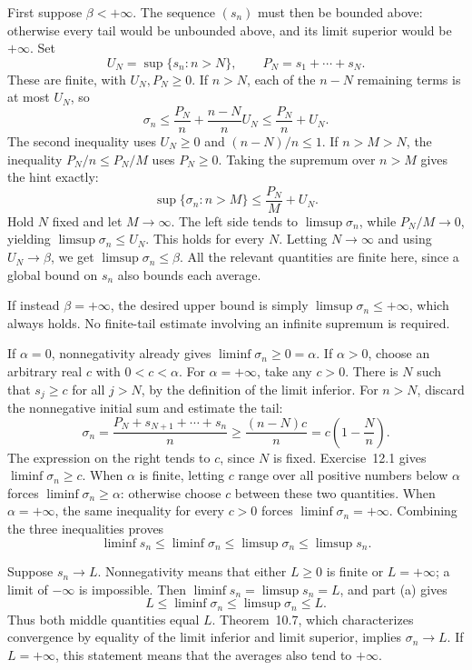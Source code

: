 First suppose $\beta<+\infty$. The sequence $(s_n)$ must then be
bounded above: otherwise every tail would be unbounded above, and
its limit superior would be $+\infty$. Set
\[
 U_N=\sup\{s_n:n>N\},\qquad P_N=s_1+\cdots+s_N.
\]
These are finite, with $U_N,P_N\ge0$. If $n>N$, each of the
$n-N$ remaining terms is at most $U_N$, so
\[
 \sigma_n\le\frac{P_N}{n}+\frac{n-N}{n}U_N
 \le\frac{P_N}{n}+U_N.
\]
The second inequality uses $U_N\ge0$ and $(n-N)/n\le1$.
If $n>M>N$, the inequality $P_N/n\le P_N/M$ uses $P_N\ge0$.
Taking the supremum over $n>M$ gives the hint exactly:
\[
 \sup\{\sigma_n:n>M\}\le\frac{P_N}{M}+U_N.
\]
Hold $N$ fixed and let $M\to\infty$. The left side tends to
$\limsup\sigma_n$, while $P_N/M\to0$, yielding
$\limsup\sigma_n\le U_N$. This holds for every $N$.
Letting $N\to\infty$ and using $U_N\to\beta$, we get
$\limsup\sigma_n\le\beta$. All the relevant quantities are finite
here, since a global bound on $s_n$ also bounds each average.

If instead $\beta=+\infty$, the desired upper bound is simply
$\limsup\sigma_n\le+\infty$, which always holds. No finite-tail
estimate involving an infinite supremum is required.

If $\alpha=0$, nonnegativity already gives
$\liminf\sigma_n\ge0=\alpha$.
If $\alpha>0$, choose an arbitrary real $c$ with $0<c<\alpha$.
For $\alpha=+\infty$, take any $c>0$. There is $N$ such that
$s_j\ge c$ for all $j>N$, by the definition of the limit inferior.
For $n>N$, discard the nonnegative initial sum and estimate the tail:
\[
 \sigma_n
 =\frac{P_N+s_{N+1}+\cdots+s_n}{n}
 \ge\frac{(n-N)c}{n}
 =c\left(1-\frac{N}{n}\right).
\]
The expression on the right tends to $c$, since $N$ is fixed.
Exercise~12.1 gives $\liminf\sigma_n\ge c$. When $\alpha$ is
finite, letting $c$ range over all positive numbers below $\alpha$
forces $\liminf\sigma_n\ge\alpha$: otherwise choose $c$ between
these two quantities. When $\alpha=+\infty$, the same inequality
for every $c>0$ forces $\liminf\sigma_n=+\infty$.
Combining the three inequalities proves
\[
 \boxed{\liminf s_n\le\liminf\sigma_n\le
 \limsup\sigma_n\le\limsup s_n.}
\]

Suppose $s_n\to L$. Nonnegativity means that either $L\ge0$ is
finite or $L=+\infty$; a limit of $-\infty$ is impossible.
Then $\liminf s_n=\limsup s_n=L$, and part (a) gives
\[
 L\le\liminf\sigma_n\le\limsup\sigma_n\le L.
\]
Thus both middle quantities equal $L$. Theorem~10.7, which
characterizes convergence by equality of the limit inferior and
limit superior, implies $\sigma_n\to L$. If $L=+\infty$, this
statement means that the averages also tend to $+\infty$.


